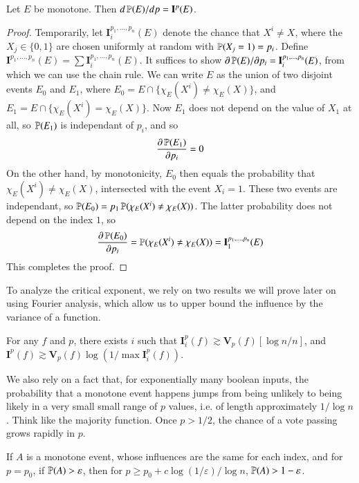 \begin{theorem}
    Let $E$ be monotone. Then $d\operatorname{\mathbb{P}}(E)/dp = \mathbf{I}^p(E)$.
\end{theorem}
\begin{proof}
    Temporarily, let $\mathbf{I}_i^{p_1, \dots, p_n}(E)$ denote the chance that $X^i \neq X$, where the $X_j \in \{ 0, 1 \}$ are chosen uniformly at random with $\operatorname{\mathbb{P}}(X_j = 1) = p_i$. Define $\mathbf{I}^{p_1, \dots, p_n}(E) = \sum \mathbf{I}^{p_1, \dots, p_n}_i(E)$. It suffices to show $\partial \operatorname{\mathbb{P}}(E) / \partial p_i = \mathbf{I}_i^{p_1,\dots,p_n}(E)$, from which we can use the chain rule. We can write $E$ as the union of two disjoint events $E_0$ and $E_1$, where $E_0 = E \cap \{ \chi_E(X^i) \neq \chi_E(X) \}$, and $E_1 = E \cap \{ \chi_E(X^i) = \chi_E(X) \}$. Now $E_1$ does not depend on the value of $X_1$ at all, so $\operatorname{\mathbb{P}}(E_1)$ is independant of $p_i$, and so
    \[ \frac{\partial \operatorname{\mathbb{P}}(E_1)}{\partial p_i} = 0 \]
    On the other hand, by monotonicity, $E_0$ then equals the probability that $\chi_E(X^i) \neq \chi_E(X)$, intersected with the event $X_i = 1$. These two events are independant, so $\operatorname{\mathbb{P}}(E_0) = p_1 \operatorname{\mathbb{P}}(\chi_E(X^i) \neq \chi_E(X))$. The latter probability does not depend on the index $1$, so
    \[ \frac{\partial \operatorname{\mathbb{P}}(E_0)}{\partial p_i} = \operatorname{\mathbb{P}}(\chi_E(X^i) \neq \chi_E(X)) = \mathbf{I}^{p_1, \dots, p_n}_1(E) \]
    This completes the proof.
\end{proof}

To analyze the critical exponent, we rely on two results we will prove later on using Fourier analysis, which allow us to upper bound the influence by the variance of a function.

\begin{theorem}
    For any $f$ and $p$, there exists $i$ such that $\mathbf{I}_i^p(f) \gtrsim \mathbf{V}_p(f) [\log n / n]$, and $\mathbf{I}^p(f) \gtrsim \mathbf{V}_p(f) \log(1/\max \mathbf{I}_i^p(f))$.
\end{theorem}

We also rely on a fact that, for exponentially many boolean inputs, the probability that a monotone event happens jumps from being unlikely to being likely in a very small small range of $p$ values, i.e. of length approximately $1/\log n$. Think like the majority function. Once $p > 1/2$, the chance of a vote passing grows rapidly in $p$.

\begin{theorem}
    If $A$ is a monotone event, whose influences are the same for each index, and for $p = p_0$, if $\operatorname{\mathbb{P}}(A) > \varepsilon$, then for $p \geq p_0 + c \log(1/\varepsilon)/\log n$, $\operatorname{\mathbb{P}}(A) > 1 - \varepsilon$.
\end{theorem}

